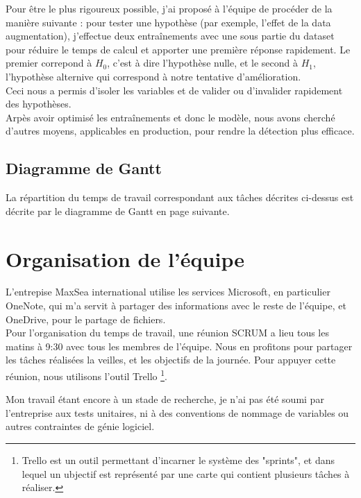 Pour être le plus rigoureux possible, j'ai proposé à l'équipe de procéder de la manière suivante : 
pour tester une hypothèse (par exemple, l'effet de la data augmentation), j'effectue deux entraînements
avec une sous partie du dataset pour réduire le temps de calcul et apporter une première réponse rapidement.
Le premier correpond à \(H_{0}\), c'est à dire l'hypothèse nulle, et le second à \(H_{1}\), l'hypothèse 
alternive qui correspond à notre tentative d'amélioration.\\

Ceci nous a permis d'isoler les variables et de valider ou d'invalider rapidement des hypothèses.\\

Arpès avoir optimisé les entraînements et donc le modèle, nous avons cherché d'autres moyens, applicables en production, 
pour rendre la détection plus efficace. 

\subsection{Diagramme de Gantt}

La répartition du temps de travail correspondant aux tâches décrites ci-dessus est décrite par 
le diagramme de Gantt en page suivante.



\section{Organisation de l'équipe}

L'entrepise MaxSea international utilise les services Microsoft, en particulier OneNote, 
qui m'a servit à partager des informations avec le reste de l'équipe, et OneDrive, 
pour le partage de fichiers.\\

Pour l'organisation du temps de travail, une réunion SCRUM a lieu tous les matins à 9:30 avec 
tous les membres de l'équipe. Nous en profitons pour partager les tâches réalisées la veilles, 
et les objectifs de la journée. Pour appuyer cette réunion, nous utilisons l'outil Trello \footnote{Trello est 
un outil permettant d'incarner le système des "sprints", et dans lequel un ubjectif est représenté par 
une carte qui contient plusieurs tâches à réaliser.}.

Mon travail étant encore à un stade de recherche, je n'ai pas été soumi par l'entreprise aux tests unitaires, 
ni à des conventions de nommage de variables ou autres contraintes de génie logiciel. 
